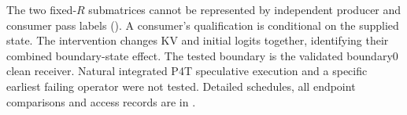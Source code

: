 The two fixed-$R$ submatrices cannot be represented by independent producer and consumer pass labels (). A consumer's qualification is conditional on the supplied state. The intervention changes KV and initial logits together, identifying their combined boundary-state effect. The tested boundary is the validated boundary0 clean receiver. Natural integrated P4T speculative execution and a specific earliest failing operator were not tested. Detailed schedules, all endpoint comparisons and access records are in .
